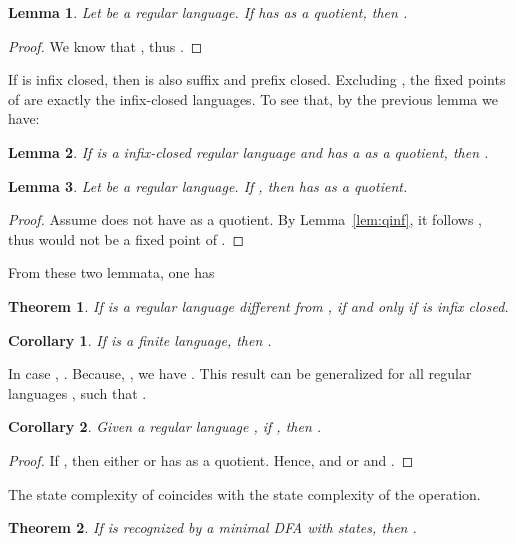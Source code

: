 \documentclass{article}
\newtheorem{lemma}{Lemma}
\newtheorem{theorem}{Theorem}
\newtheorem{corollary}{Corollary}
\newcommand{\dfa}{DFA\xspace}
\begin{document}
\begin{lemma}
\label{lem:qeinf}
Let  be a regular language. If  has  as a  quotient, then  .
\end{lemma}
\begin{proof}
We know that , thus .
\end{proof}


If  is infix closed, then  is also suffix and prefix closed. 
Excluding , the fixed points of  are exactly the infix-closed languages. 
To see that, by the previous lemma we have:


\begin{lemma}
\label{lem:inffixpoint}
If  is a infix-closed regular language and   has a  as a quotient, then .
\end{lemma}

\begin{lemma}
\label{lem:dinfpe}
Let  be a regular language. If  , then 
 has  as a quotient.
 \end{lemma}
\begin{proof}
Assume  does not have  as a quotient.
By Lemma~\ref{lem:qinf}, it follows  , thus  would not be a fixed point of .
\end{proof}



From these two lemmata, one has
\begin{theorem}
\label{theo:dinffixpoint}
If  is a regular language different from ,  if and only if  is infix closed.
\end{theorem}

\begin{corollary}
\label{cor:dinffinite}
  If  is a finite language, then .
\end{corollary}

In case , . Because,
, we have .
This result can be generalized for all regular languages , such that .

\begin{corollary}
\label{cor:f2f}
Given  a regular language , if , then . 
\end{corollary}
\begin{proof}
If , then either  or  has  as a quotient.
Hence,    and  or
  and  .
\end{proof}



The state complexity of  coincides with the state complexity of the  operation.

\begin{theorem}
\label{theo:scdinf}
If  is recognized by a minimal \dfa with  states, then
.
\end{theorem}
\end{document}
